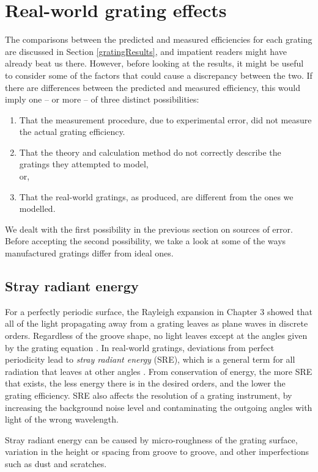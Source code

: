 \section{Real-world grating effects}
\label{realWorldEffects}
The comparisons between the predicted and measured efficiencies for each grating are discussed in Section \ref{gratingResults}, and impatient readers might have already beat us there.  However, before looking at the results, it might be useful to consider some of the factors that could cause a discrepancy between the two.  If there are differences between the predicted and measured efficiency, this would imply one -- or more -- of three distinct possibilities:
\begin{enumerate}
\item That the measurement procedure, due to experimental error, did not measure the actual grating efficiency.
\item That the theory and calculation method do not correctly describe the gratings they attempted to model,\\
or,
\item That the real-world gratings, as produced, are different from the ones we modelled.
\end{enumerate}
We dealt with the first possibility in the previous section on sources of error.  Before accepting the second possibility, we take a look at some of the ways manufactured gratings differ from ideal ones.

\subsection{Stray radiant energy}
For a perfectly periodic surface, the Rayleigh expansion in Chapter 3 showed that all of the light propagating away from a grating leaves as plane waves in discrete orders. Regardless of the groove shape, no light leaves except at the angles given by the grating equation .  In real-world gratings, deviations from perfect periodicity lead to \emph{stray radiant energy} (SRE), which is a general term for all radiation that leaves at other angles \cite{RicTN9}. From conservation of energy, the more SRE that exists, the less energy there is in the desired orders, and the lower the grating efficiency.  SRE also affects the resolution of a grating instrument, by increasing the background noise level and contaminating the outgoing angles with light of the wrong wavelength.

Stray radiant energy can be caused by micro-roughness of the grating surface, variation in the height or spacing from groove to groove, and other imperfections such as dust and scratches.
